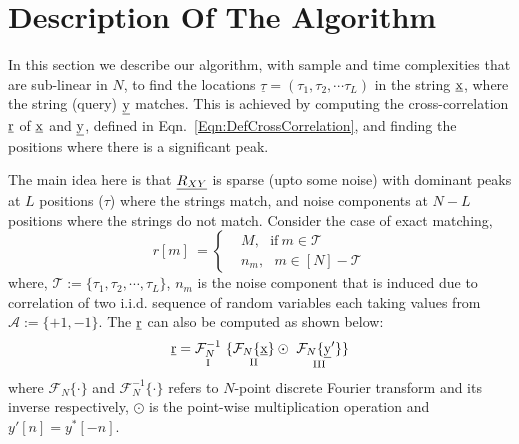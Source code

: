 \section{Description Of The Algorithm}
In this section we describe our algorithm, with sample and time complexities that are sub-linear in $N$, to find the locations $\underline{\tau} = (\tau_1, \tau_2, \cdots \tau_L)$ in the string $\underline{\mathrm{x}}$, where the string (query) $\underline{\mathrm{y}}$ matches. This is achieved by computing the cross-correlation $\underline{\mathrm{r}}$ of $\underline{\mathrm{x}}$ and $\underline{\mathrm{y}}$, defined in Eqn.~\eqref{Eqn:DefCrossCorrelation}, and finding the positions where there is a significant peak. 
%

The main idea here is that $\underline{R_{XY}}$ is sparse (upto some noise) with dominant peaks at $L$ positions ($\tau$) where the strings match, and noise components at $N-L$ positions where the strings do not match. Consider the case of exact matching,
\begin{equation} \label{eqn:RXY_sparse}
r[m] \ = \left\{
\begin{array}{ll}
  &M , \ \ \  \text{if} \ m \in \mathcal{T} \\
  & n_m , \ \ \ m \in [N]-\mathcal{T}
\end{array} 
\right.  
\end{equation}
where, $ \mathcal{T}:=\{\tau_1, \tau_2, \cdots, \tau_L\}$,
 $n_m$ is the noise component that is induced due to correlation of two i.i.d. sequence of random variables each taking values from $\mathcal{A} := \{+1,-1\}$. The $\underline{\mathrm{r}}$ can also be computed as shown below:
\begin{equation}\label{eqn:Rxy_fourier}
  \rv = \underset{\text{ \RNum{1} } } {\mathcal{F}_{N}^{-1}} \ \{ \underset{\text{ \RNum{2} } }{  \mathcal{F}_{N}\{\xv\}}  \odot \ \underset{\text{ \RNum{3} } }{ \mathcal{F}_{N}\{\yv'\}}  \} 
\end{equation} 
where $\mathcal{F}_{N}\{ \cdot \}$ and $\mathcal{F}_{N}^{-1}\{ \cdot \}$ refers to $N$-point discrete Fourier transform and its inverse respectively, $\odot$ is the point-wise multiplication operation and ${ y'[n]} = { y^{*}[-n]}$. 

